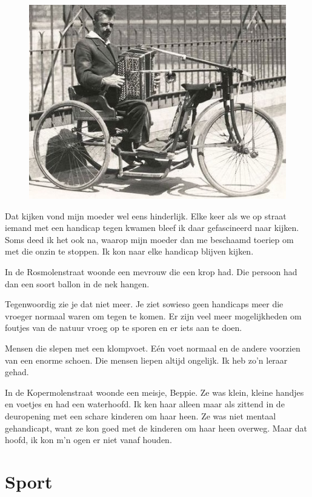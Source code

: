 \documentclass[12pt,twoside]{memoir}
\begin{document}
\begin{figure}
\includegraphics[width=\textwidth]{img/ch10/rolstoel}
\end{figure}

Dat kijken vond mijn moeder wel eens hinderlijk. Elke keer als we op straat iemand met een handicap tegen kwamen bleef ik daar gefascineerd naar kijken. Soms deed ik het ook na, waarop mijn moeder dan me beschaamd toeriep om met die onzin te stoppen. Ik kon naar elke handicap blijven kijken.

In de Rosmolenstraat woonde een mevrouw die een krop had. Die persoon had dan een soort ballon in de nek hangen. 

Tegenwoordig zie je dat niet meer. Je ziet sowieso geen handicaps meer die vroeger normaal waren om tegen te komen. Er zijn veel meer mogelijkheden om foutjes van de natuur vroeg op te sporen en er iets aan te doen.

Mensen die slepen met een klompvoet. Eén voet normaal en de andere voorzien van een enorme schoen. Die mensen liepen altijd ongelijk. Ik heb zo’n leraar gehad.

In de Kopermolenstraat woonde een meisje, Beppie. Ze was klein, kleine handjes en voetjes en had een waterhoofd. Ik ken haar alleen maar als zittend in de deuropening met een schare kinderen om haar heen. Ze was niet mentaal gehandicapt, want ze kon goed met de kinderen om haar heen overweg. Maar dat hoofd, ik kon m’n ogen er niet vanaf houden.

\chapter{Sport} %
\label{cha:sport}
\end{document}
